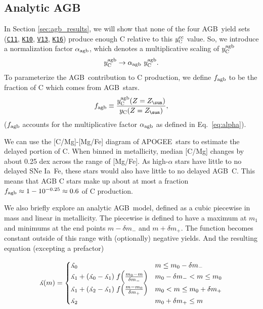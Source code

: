 \documentclass[fleqn,usenatbib]{mnras}
\newcommand{\cxi}{\texttt{\hyperlink{C11}{C11}}}
\newcommand{\kx}{\texttt{\hyperlink{K10}{K10}}}
\newcommand{\kxvi}{\texttt{\hyperlink{K16}{K16}}}
\newcommand{\vxiii}{\texttt{\hyperlink{V13}{V13}}}
\newcommand{\agb}{AGB}
\newcommand{\apogee}{APOGEE}
\newcommand{\ia}{SNe Ia}
\newcommand{\caafe}{[C/Mg]-[Mg/Fe]}
\newcommand{\Yct}{\ensuremath{y_{\rm C}}}
\newcommand{\Ycc}{\ensuremath{y_{\rm C}^{\rm cc}}}
\newcommand{\Ycagb}{\ensuremath{y_{\rm C}^{\rm agb}}}
\newcommand{\y}{\ensuremath{\rotatebox[origin=B,y=0.5ex]{180}{y}}}
\newcommand{\Zo}{%
    \ifmmode Z_{\sun}%
    \else $Z_{\sun}$%
    \fi}
\begin{document}
\subsection{Analytic AGB}


In Section \ref{sec:agb_results}, we will show that none of the four \agb\ yield sets (\cxi{}, \kx{}, \vxiii{}, \kxvi{}) produce enough C relative to this $\Ycc$ value. So, we introduce a normalization factor $\alpha_{\rm agb}$, which denotes a multiplicative scaling of $\Ycagb$ 
\begin{equation} \label{eq:alpha}
        \Ycagb \rightarrow \alpha_{\rm agb}\ \Ycagb.
\end{equation}
To parameterize the \agb\ contribution to C production, we define $f_{\rm agb}$ to be the fraction of C which comes from \agb\ stars. 
\begin{equation}\label{eq:f_agb}
    f_{\rm agb} \equiv \frac{\Ycagb(Z=\Zo)}{\Yct(Z=\Zo)},
\end{equation}
($f_{\rm agb}$ accounts for the multiplicative factor $\alpha_{\rm agb}$ as defined in Eq.~\ref{eq:alpha}). 


We can use the \caafe{} diagram of \apogee\ stars to estimate the delayed portion of C. When binned in metallicity, median [C/Mg] changes by about 0.25 dex across the range of [Mg/Fe]. As high-$\alpha$ stars have little to no delayed \ia\ Fe, these stars would also have little to no delayed \agb\ C. This means that AGB C stars make up about at most a fraction $f_{\rm agb} \approx 1 - 10^{-0.25} \approx 0.6$ of C production.

We also briefly explore an analytic \agb\ model, defined as a cubic piecewise in mass and linear in metallicity.
The piecewise is defined to have a maximum at $m_1$ and minimums at
the end points $m-\delta m_-$ and $m+\delta m_+$. The function becomes constant
outside of this range with (optionally) negative yields.
And the resulting equation (excepting a prefactor)

\begin{equation}
\y(m) = 
\begin{cases}
\y_0 & m \leq m_0 - \delta m_- \\
\y_1 + (\y_0 - \y_1)\; f\!\left(\frac{m_0 - m}{\delta m_-}\right) 
    & m_0 - \delta m_- < m \leq m_0 \\
    \y_1 + (\y_2 - \y_1)\; f\!\left(\frac{m - m_0}{\delta m_+}\right)
    & m_0 < m \leq m_0 + \delta m_+ \\
\y_2 & m_0 + \delta m_+ \leq m
\end{cases}
\end{equation}
\end{document}
